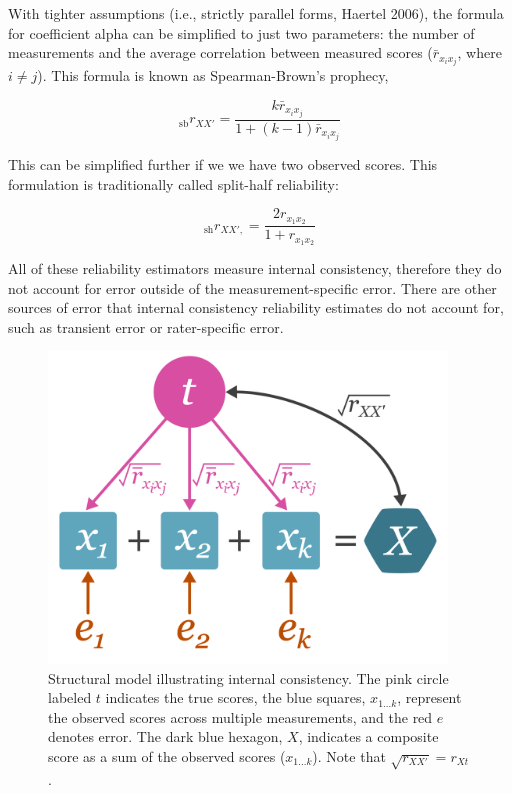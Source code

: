 \documentclass[
  letterpaper,
  DIV=11,
  numbers=noendperiod]{scrreprt}
\begin{document}
With tighter assumptions (i.e., strictly parallel forms, Haertel 2006),
the formula for coefficient alpha can be simplified to just two
parameters: the number of measurements and the average correlation
between measured scores (\(\bar{r}_{x_i x_j}\), where \(i\neq j\)). This
formula is known as Spearman-Brown's prophecy,

\[
_\text{sb} r_{XX'}= \frac{k \bar{r}_{x_i x_j}}{1+(k-1)\bar{r}_{x_i x_j}}
\]

This can be simplified further if we we have two observed scores. This
formulation is traditionally called split-half reliability:

\[
_\text{sh}r_{XX',}= \frac{2r_{x_1 x_2}}{1+r_{x_1 x_2}}
\]

All of these reliability estimators measure internal consistency,
therefore they do not account for error outside of the
measurement-specific error. There are other sources of error that
internal consistency reliability estimates do not account for, such as
transient error or rater-specific error.

\begin{figure}

{\centering \includegraphics[width=4.16667in,height=\textheight]{figure/unreliability_diagram_2.png}

}

\caption{Structural model illustrating internal consistency. The pink
circle labeled \(t\) indicates the true scores, the blue squares,
\(x_{1...k}\), represent the observed scores across multiple
measurements, and the red \(e\) denotes error. The dark blue hexagon,
\(X\), indicates a composite score as a sum of the observed scores
(\(x_{1...k}\)). Note that \(\sqrt{r_{XX'}}=r_{Xt}\).}

\end{figure}
\end{document}
